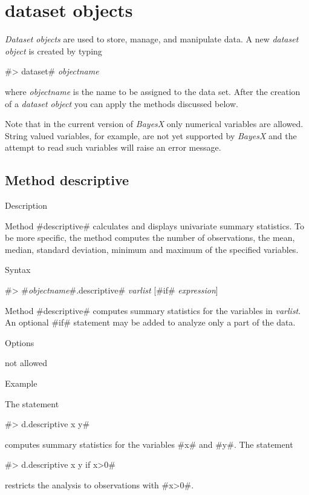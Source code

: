 \chapter{dataset objects} \label{chap_data}
\label{datasetobj}  


{\em Dataset objects} are used to store, manage, and manipulate
data. A new {\em dataset object} is created by typing

#> dataset# {\em objectname}

where {\em objectname} is the name to be assigned to the data set.
After the creation of a {\em dataset object} you can apply the
methods discussed below.

Note that in the current version of {\em BayesX} only numerical
variables are allowed. String valued variables, for example, are
not yet supported by {\em BayesX} and the attempt to read such
variables will raise an error message.

\clearpage

\section{Method descriptive} \label{descriptive}   

\begin{stanza}{Description}

Method #descriptive# calculates and displays univariate summary
statistics. To be more specific, the method computes the number of
observations, the mean, median, standard deviation, minimum and
maximum of the specified variables.
\end{stanza}

\begin{stanza}{Syntax}

 #> #{\em objectname}#.descriptive# {\em varlist} [#if# {\em expression}]

Method #descriptive# computes summary statistics for the variables
in {\em varlist}. An optional #if# statement may be added to
analyze only a part of the data.
\end{stanza}

\begin{stanza}{Options}

not allowed
\end{stanza}


\begin{stanza}{Example}

{The statement

#> d.descriptive x y#

computes summary statistics for the variables #x# and #y#.
The statement

#> d.descriptive x y if x>0#

restricts the analysis to observations with #x>0#.}
\end{stanza}

